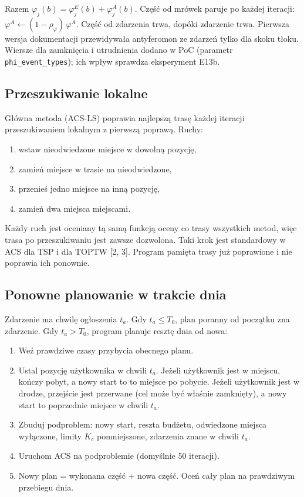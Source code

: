 \documentclass[11pt,a4paper]{article}
\begin{document}
Razem $\varphi_j(b) = \varphi_j^E(b) + \varphi_j^A(b)$. Część od mrówek paruje po każdej iteracji: $\varphi^A \leftarrow (1 - \rho_\varphi)\,\varphi^A$. Część od zdarzenia trwa, dopóki zdarzenie trwa. Pierwsza wersja dokumentacji przewidywała antyferomon ze zdarzeń tylko dla skoku tłoku. Wiersze dla zamknięcia i utrudnienia dodano w PoC (parametr \texttt{phi\_event\_types}); ich wpływ sprawdza eksperyment E13b.

\subsection{Przeszukiwanie lokalne}

Główna metoda (ACS-LS) poprawia najlepszą trasę każdej iteracji przeszukiwaniem lokalnym z pierwszą poprawą. Ruchy:
\begin{enumerate}
  \item wstaw nieodwiedzone miejsce w dowolną pozycję,
  \item zamień miejsce w trasie na nieodwiedzone,
  \item przenieś jedno miejsce na inną pozycję,
  \item zamień dwa miejsca miejscami.
\end{enumerate}
Każdy ruch jest oceniany tą samą funkcją oceny co trasy wszystkich metod, więc trasa po przeszukiwaniu jest zawsze dozwolona. Taki krok jest standardowy w ACS dla TSP i dla TOPTW [2, 3]. Program pamięta trasy już poprawione i nie poprawia ich ponownie.

\subsection{Ponowne planowanie w trakcie dnia}

Zdarzenie ma chwilę ogłoszenia $t_a$. Gdy $t_a \leq T_0$, plan poranny od początku zna zdarzenie. Gdy $t_a > T_0$, program planuje resztę dnia od nowa:
\begin{enumerate}
  \item Weź prawdziwe czasy przybycia obecnego planu.
  \item Ustal pozycję użytkownika w chwili $t_a$. Jeżeli użytkownik jest w miejscu, kończy pobyt, a nowy start to to miejsce po pobycie. Jeżeli użytkownik jest w drodze, przejście jest przerwane (cel może być właśnie zamknięty), a nowy start to poprzednie miejsce w chwili $t_a$.
  \item Zbuduj podproblem: nowy start, reszta budżetu, odwiedzone miejsca wyłączone, limity $K_c$ pomniejszone, zdarzenia znane w chwili $t_a$.
  \item Uruchom ACS na podproblemie (domyślnie 50 iteracji).
  \item Nowy plan = wykonana część + nowa część. Oceń cały plan na prawdziwym przebiegu dnia.
\end{enumerate}
\end{document}
